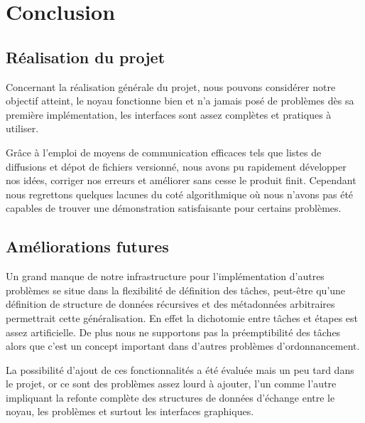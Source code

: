 \chapter{Conclusion}
\section{Réalisation du projet}
Concernant la réalisation générale du projet, nous pouvons considérer notre
objectif atteint, le noyau fonctionne bien et n'a jamais posé de problèmes
dès sa première implémentation, les interfaces sont assez complètes et pratiques
à utiliser.

Grâce à l'emploi de moyens de communication efficaces tels que
listes de diffusions et dépot de fichiers versionné, nous avons pu rapidement
développer nos idées, corriger nos erreurs et améliorer sans cesse le produit
finit. Cependant nous regrettons quelques lacunes du coté algorithmique où
nous n'avons pas été capables de trouver une démonstration satisfaisante pour
certains problèmes.
\section{Améliorations futures}
Un grand manque de notre infrastructure pour l'implémentation d'autres problèmes
se situe dans la flexibilité de définition des tâches, peut-être qu'une
définition de structure de données récursives et des métadonnées arbitraires
permettrait cette généralisation. En effet la dichotomie entre tâches et étapes
est assez artificielle. De plus nous ne supportons pas la préemptibilité des tâches alors que c'est un concept important dans d'autres problèmes d'ordonnancement. 

La possibilité d'ajout de ces fonctionnalités a été évaluée mais un peu tard dans
le projet, or ce sont des problèmes assez lourd à ajouter, l'un comme l'autre
impliquant la refonte complète des structures de données d'échange entre le
noyau, les problèmes et surtout les interfaces graphiques.
